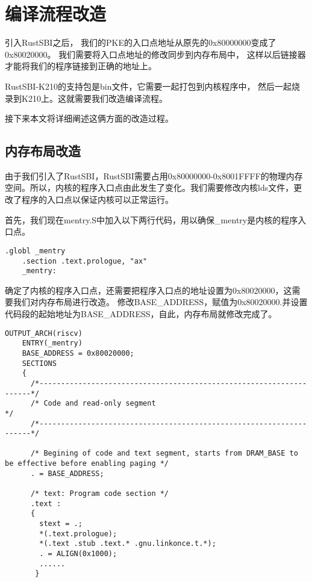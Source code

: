 \section{编译流程改造}

引入RustSBI之后，
我们的PKE的入口点地址从原先的0x80000000变成了0x80020000。
我们需要将入口点地址的修改同步到内存布局中，
这样以后链接器才能将我们的程序链接到正确的地址上。

RustSBI-K210的支持包是bin文件，它需要一起打包到内核程序中，
然后一起烧录到K210上。这就需要我们改造编译流程。

接下来本文将详细阐述这俩方面的改造过程。

\subsection{内存布局改造}
由于我们引入了RustSBI，RustSBI需要占用0x80000000-0x8001FFFF的物理内存空间。所以，内核的程序入口点由此发生了变化。我们需要修改内核lds文件，更改了程序的入口点以保证内核可以正常运行。

首先，我们现在mentry.S中加入以下两行代码，用以确保\_mentry是内核的程序入口点。

\begin{lstlisting}[caption={修改内核程序入口点}, label={lst:change_kernel_entry}]
    .globl _mentry
    .section .text.prologue, "ax"
    _mentry:
\end{lstlisting}

确定了内核的程序入口点，还需要把程序入口点的地址设置为0x80020000，这需要我们对内存布局进行改造。
修改BASE\_ADDRESS，赋值为0x80020000.并设置代码段的起始地址为BASE\_ADDRESS，自此，内存布局就修改完成了。

\begin{lstlisting}[caption={修改内存布局}, label={lst:change_memory_layout}]
    OUTPUT_ARCH(riscv)
    ENTRY(_mentry)
    BASE_ADDRESS = 0x80020000;
    SECTIONS
    {
      /*--------------------------------------------------------------------*/
      /* Code and read-only segment                                         */
      /*--------------------------------------------------------------------*/
    
      /* Begining of code and text segment, starts from DRAM_BASE to be effective before enabling paging */
      . = BASE_ADDRESS;
      
      /* text: Program code section */
      .text : 
      {
        stext = .;
        *(.text.prologue);
        *(.text .stub .text.* .gnu.linkonce.t.*);
        . = ALIGN(0x1000);
        ......
       }
    
\end{lstlisting}

